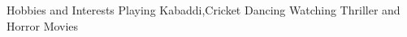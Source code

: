 \begin{rubric}{Hobbies and Interests}
\entry* Playing Kabaddi,Cricket
\entry* Dancing
\entry* Watching Thriller and Horror Movies 
\end{rubric}
